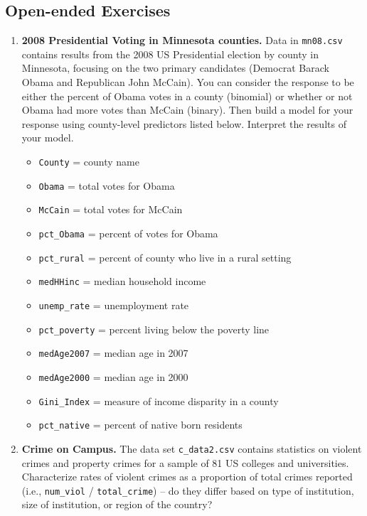 \documentclass[
]{krantz}
\providecommand{\tightlist}{%
  \setlength{\itemsep}{0pt}\setlength{\parskip}{0pt}}
\begin{document}
\hypertarget{open-ended-exercises-2}{%
\subsection{Open-ended Exercises}\label{open-ended-exercises-2}}

\begin{enumerate}
\def\labelenumi{\arabic{enumi}.}
\item
  \textbf{2008 Presidential Voting in Minnesota counties.} Data in \texttt{mn08.csv} contains results from the 2008 US Presidential election by county in Minnesota, focusing on the two primary candidates (Democrat Barack Obama and Republican John McCain). You can consider the response to be either the percent of Obama votes in a county (binomial) or whether or not Obama had more votes than McCain (binary). Then build a model for your response using county-level predictors listed below. Interpret the results of your model.

  \begin{itemize}
  \tightlist
  \item
    \texttt{County} = county name
  \item
    \texttt{Obama} = total votes for Obama
  \item
    \texttt{McCain} = total votes for McCain
  \item
    \texttt{pct\_Obama} = percent of votes for Obama
  \item
    \texttt{pct\_rural} = percent of county who live in a rural setting
  \item
    \texttt{medHHinc} = median household income
  \item
    \texttt{unemp\_rate} = unemployment rate
  \item
    \texttt{pct\_poverty} = percent living below the poverty line
  \item
    \texttt{medAge2007} = median age in 2007
  \item
    \texttt{medAge2000} = median age in 2000
  \item
    \texttt{Gini\_Index} = measure of income disparity in a county
  \item
    \texttt{pct\_native} = percent of native born residents
  \end{itemize}
\item
  \textbf{Crime on Campus.} The data set \texttt{c\_data2.csv} contains statistics on violent crimes and property crimes for a sample of 81 US colleges and universities. Characterize rates of violent crimes as a proportion of total crimes reported (i.e., \texttt{num\_viol} / \texttt{total\_crime}) -- do they differ based on type of institution, size of institution, or region of the country?


\end{enumerate}
\end{document}
